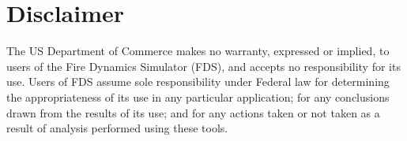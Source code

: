 \documentclass[11pt]{book}
\begin{document}
\begin{minipage}[t][9in][s]{6.5in}

\huge {}

\vspace{.75in}

\Huge {}

\vspace{.25in}

\normalsize
{}

\vspace{.25in}


\vfill


\titlesigs

\end{minipage}



\newpage

\frontmatter

\pagestyle{plain}



\chapter{Disclaimer}

The US Department of Commerce makes no warranty, expressed or implied,
to users of the Fire Dynamics Simulator (FDS), and accepts no responsibility for its use.
Users of FDS assume sole responsibility under Federal law for determining
the appropriateness of its use in any particular application;
for any conclusions drawn from the results of its use; and for any
actions taken or not taken as a result of analysis performed using these tools.
\end{document}
